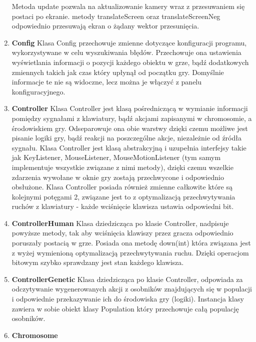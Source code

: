 \begin{par}
\begin{enumerate}
	Metoda update pozwala na aktualizowanie kamery wraz z przesuwaniem się postaci po ekranie.
	metody translateScreen oraz translateScreenNeg odpowiednio przesuwają ekran o żądany wektor przesunięcia.
	\item{\bf Config }\newline
	Klasa Config przechowuje zmienne dotyczące konfiguracji programu, wykorzystywane w celu wyszukiwania błędów. Przechowuje ona ustawienia wyświetlania informacji o pozycji każdego obiektu w grze, bądź dodatkowych zmiennych takich jak czas który upłynął od początku gry.
	Domyślnie informacje te nie są widoczne, lecz można je włączyć z panelu konfiguracyjnego.
	\item{\bf Controller }\newline
	Klasa Controller jest klasą pośredniczącą w wymianie informacji pomiędzy sygnałami z klawiatury, bądź akcjami zapisanymi w chromosomie, a środowiskiem gry. Odseparowuje ona obie warstwy dzięki czemu możliwe jest pisanie logiki gry, bądź reakcji na poszczególne akcje, niezależnie od źródła sygnału. Klasa Controller jest klasą abstrakcyjną i uzupełnia interfejsy takie jak KeyListener, MouseListener, MouseMotionListener (tym samym implementuje wszystkie związane z nimi metody), dzięki czemu wszelkie zdarzenia wywołane w oknie gry zostają przechwycone i odpowiednio obsłużone. Klasa Controller posiada również zmienne całkowite które są kolejnymi potęgami 2, związane jest to z optymalizacją przechwytywania ruchów z klawiatury - każde wciśnięcie klawisza ustawia odpowiedni bit.
	\item{\bf ControllerHuman }\newline
	Klasa dziedzicząca po klasie Controller, nadpisuje powyższe metody, tak aby wciśnięcia klawiszy przez gracza odpowiednio poruszały postacią w grze. Posiada ona metodę down(int) która związana jest z wyżej wymienioną optymalizacją przechwytywania ruchu. Dzięki operacjom bitowym szybko sprawdzany jest stan każdego klawisza.
	\item{\bf ControllerGenetic }\newline
	Klasa dziedzicząca po klasie Controller, odpowiada za odczytywanie wygenerowanych akcji z osobników znajdujących się w populacji i odpowiednie przekazywanie ich do środowiska gry (logiki). Instancja klasy zawiera w sobie obiekt klasy Population który przechowuje całą populację osobników.
	\item{\bf Chromosome }\newline

\end{enumerate}
\end{par}
